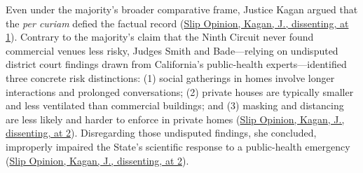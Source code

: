 \documentclass[12pt]{article}
\begin{document}
Even under the majority's broader comparative frame, Justice Kagan argued that the \textit{per curiam} defied the factual record (\href{https://www.supremecourt.gov/opinions/20pdf/20a151_4g15.pdf}{Slip Opinion, Kagan, J., dissenting, at 1}). Contrary to the majority's claim that the Ninth Circuit never found commercial venues less risky, Judges Smith and Bade---relying on undisputed district court findings drawn from California's public-health experts---identified three concrete risk distinctions: (1) social gatherings in homes involve longer interactions and prolonged conversations; (2) private houses are typically smaller and less ventilated than commercial buildings; and (3) masking and distancing are less likely and harder to enforce in private homes (\href{https://www.supremecourt.gov/opinions/20pdf/20a151_4g15.pdf}{Slip Opinion, Kagan, J., dissenting, at 2}). Disregarding those undisputed findings, she concluded, improperly impaired the State's scientific response to a public-health emergency (\href{https://www.supremecourt.gov/opinions/20pdf/20a151_4g15.pdf}{Slip Opinion, Kagan, J., dissenting, at 2}).
\end{document}
